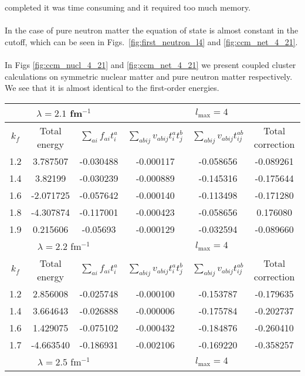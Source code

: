 completed it was time consuming and it required too much memory.\\
\\
In the case of pure neutron matter the equation of state is almost 
constant in the cutoff, which can be seen in Figs.~\ref{fig:first_neutron_l4} and \ref{fig:ccm_net_4_21}.\\
\\
In Figs \ref{fig:ccm_nucl_4_21} and \ref{fig:ccm_net_4_21} we present coupled cluster calculations on symmetric nuclear matter and pure neutron matter respectively.
We see that it is almost identical to the first-order energies.%
%
\begin{table}
		\centering
		\begin{tabular}{|c|c|c|c|c|c|}
				\hline
				\multicolumn{3}{|c|}{$\lambda=2.1$ fm$^{-1}$}& \multicolumn{3}{c|}{$l_{\mbox{max}}=4$ }\\
				\hline
				$k_f$ & Total energy & $\sum_{ai}f_{ai}t^a_i$ & $\sum_{abij}v_{abij}t^a_it^b_j$ & $\sum_{abij}v_{abij}t^{ab}_{ij}$ & Total correction\\
				\hline
				1.2 & 3.787507 & -0.030488 & -0.000117 & -0.058656 & -0.089261  \\
				\hline
				1.4 & 3.82199 &  -0.030239 & -0.000889 & -0.145316 & -0.175644\\
				\hline
				1.6 & -2.071725 & -0.057642 & -0.000140 & -0.113498 & -0.171280 \\
				\hline
				1.8 & -4.307874 & -0.117001 & -0.000423 & -0.058656 & 0.176080 \\
				\hline
				1.9 & 0.215606 & -0.05693 & -0.000129 & -0.032594 & -0.089660 \\
				\hline
				\multicolumn{3}{|c|}{$\lambda=2.2$ fm$^{-1}$}& \multicolumn{3}{c|}{$l_{\mbox{max}}=4$ }\\
				\hline
				$k_f$ & Total energy & $\sum_{ai}f_{ai}t^a_i$ & $\sum_{abij}v_{abij}t^a_it^b_j$ & $\sum_{abij}v_{abij}t^{ab}_{ij}$ & Total correction\\
				\hline
				1.2 & 2.856008 & -0.025748 & -0.000100 & -0.153787 & -0.179635\\
				\hline
				1.4 & 3.664643 & -0.026888 & -0.000006 & -0.175784 & -0.202737\\
			    \hline
				1.6 & 1.429075 & -0.075102 & -0.000432 & -0.184876 & -0.260410\\
				\hline
				1.7 &-4.663540 & -0.186931 & -0.002106 & -0.169220 & -0.358257\\
				\hline
				\multicolumn{3}{|c|}{$\lambda=2.5$ fm$^{-1}$}& \multicolumn{3}{c|}{$l_{\mbox{max}}=4$ }\\

\end{tabular}
\end{table}
